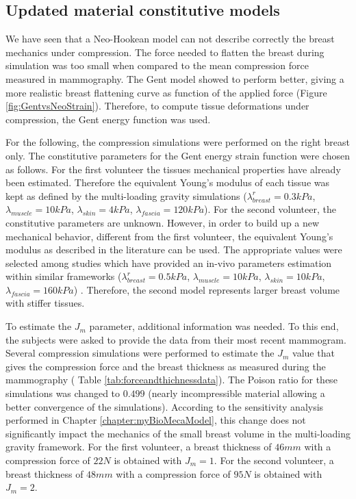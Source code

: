 \subsection{Updated material constitutive models}
We have seen that a Neo-Hookean model can not describe correctly the breast mechanics under compression. The force needed to flatten the breast during simulation was too small when compared to the mean compression force measured in mammography. 
The Gent model showed to perform better, giving a more realistic breast flattening curve as function of the applied force (Figure \ref{fig:GentvsNeoStrain}). Therefore, to compute tissue deformations under compression, the Gent energy function was used. 

For the following, the compression simulations were performed on the right breast only. The constitutive parameters for the Gent energy strain function were chosen as follows. For the first volunteer the tissues mechanical properties have already been estimated. Therefore the equivalent Young's modulus of each tissue was kept as defined by the multi-loading gravity simulations ($\lambda_{breast}^r=0.3 kPa$, $\lambda_{muscle}= 10kPa$, $\lambda_{skin}=4 kPa$, $\lambda_{fascia}=120 kPa$). For the second volunteer, the constitutive parameters are unknown. However, in order to build up a new mechanical behavior, different from the first volunteer, the equivalent Young's modulus as described in the literature can be used. The appropriate values were selected among studies which have provided an in-vivo parameters estimation within similar frameworks  ($\lambda_{breast}^r=0.5 kPa$, $\lambda_{muscle}= 10kPa$, $\lambda_{skin}=10kPa$, $\lambda_{fascia}= 160kPa$) \citep{han_nonlinear_2014, rajagopal_modelling_2007, gefen_mechanics_2007}. Therefore, the second model represents larger breast volume with stiffer tissues.  

To estimate the $J_m$ parameter, additional information was needed. To this end, the subjects were asked to provide the data from their most recent mammogram. Several compression simulations were performed to estimate the $J_m$ value that gives the compression force and the breast thickness as measured during the mammography ( Table \ref{tab:forceandthichnessdata}). The Poison ratio for these simulations was changed to $0.499$ (nearly incompressible material allowing a better convergence of the simulations). According to the sensitivity analysis performed in Chapter \ref{chapter:myBioMecaModel}, this change does not significantly impact the mechanics of the small breast volume in the multi-loading gravity framework. For the first volunteer, a breast thickness of $46mm$ with a compression force of $22N$ is obtained with  $J_m = 1$. For the second volunteer, a breast thickness of $48mm$ with a compression force of $95N$ is obtained with $J_m = 2$. 

